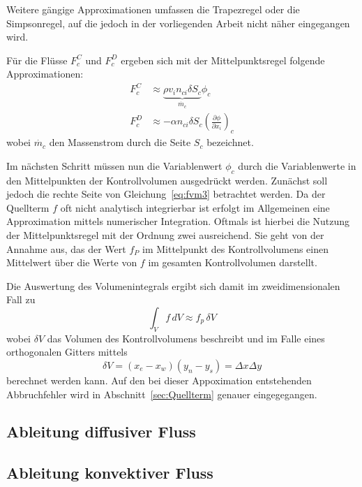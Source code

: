 Weitere gängige Approximationen umfassen die Trapezregel oder die Simpsonregel, auf die jedoch
in der vorliegenden Arbeit nicht näher eingegangen wird.

Für die Flüsse $F_c^C$ und $F_c^D$ ergeben sich mit der Mittelpunktsregel folgende Approximationen:
\begin{align*}
  F_c^C &\approx \underbrace{\rho v_i n_{ci} \delta S_c}_{\dot{m_c}}  \phi_c\\
  F_c^D &\approx  -\alpha  n_{ci} \delta S_c \left(\frac{\partial \phi}{\partial x_i}\right)_c
\end{align*}
wobei $\dot{m_c}$ den Massenstrom durch die Seite $S_c$ bezeichnet.

Im nächsten Schritt müssen nun die Variablenwert $\phi_c$ durch die Variablenwerte in den
Mittelpunkten der Kontrollvolumen ausgedrückt werden.
Zunächst soll jedoch die rechte Seite von Gleichung~\eqref{eq:fvm3} betrachtet werden.
Da der Quellterm $f$ oft nicht analytisch integrierbar ist erfolgt im Allgemeinen eine Approximation
mittels numerischer Integration. Oftmals ist hierbei die Nutzung der Mittelpunktsregel mit der Ordnung zwei
ausreichend. Sie geht von der Annahme aus, das der Wert $f_P$ im Mittelpunkt des Kontrollvolumens
einen Mittelwert über die Werte von $f$ im gesamten Kontrollvolumen darstellt.

Die Auswertung des Volumenintegrals ergibt sich damit im zweidimensionalen Fall zu
\begin{equation}
  \int_V f\,dV \approx f_p\,\delta V
\end{equation}
wobei $\delta V$ das Volumen des Kontrollvolumens beschreibt und im Falle eines orthogonalen Gitters
mittels
\begin{equation}
  \delta V = (x_e - x_w)(y_n-y_s) = \Delta x \Delta y
\end{equation}
berechnet werden kann. Auf den bei dieser Appoximation entstehenden Abbruchfehler wird in
Abschnitt~\ref{sec:Quellterm} genauer eingegegangen.
\subsection{Ableitung diffusiver Fluss}
\subsection{Ableitung konvektiver Fluss}

